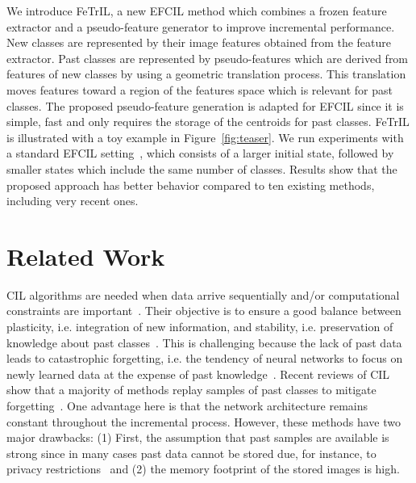 \documentclass[10pt,twocolumn,letterpaper]{article}
\makeatletter
\newcommand{\ourmodel}{FeTrIL\@\xspace}
\makeatother
\begin{document}
We introduce \ourmodel, a new EFCIL method which combines a frozen feature extractor and a pseudo-feature generator to improve incremental performance.
New classes are represented by their image features obtained from the feature extractor.
Past classes are represented by pseudo-features which are derived from features of new classes by using a geometric translation process.
This translation moves features toward a region of the features space which is relevant for past classes.
The proposed pseudo-feature generation is adapted for EFCIL since it is simple, fast and only requires the storage of the centroids for past classes.
\ourmodel is illustrated with a toy example in Figure~\ref{fig:teaser}.
We run experiments with a standard EFCIL setting~\cite{hou2019_lucir,zhu2021class,zhu2021pass}, which consists of a larger initial state, followed by smaller states which include the same number of classes.  
Results show that the proposed approach has better behavior compared to ten existing methods, including very recent ones.

\section{Related Work}
\label{sec:related}
CIL algorithms are needed when data arrive sequentially and/or computational constraints are important~\cite{hayes2022online,lange2019,masana2021_study,parisi2019_continual}. 
Their objective is to ensure a good balance between plasticity, i.e. integration of new information, and stability, i.e. preservation of knowledge about past classes~\cite{mermillod2013_stability_plasticity}.
This is challenging because the lack of past data leads to catastrophic forgetting, i.e. the tendency of neural networks to focus on newly learned data at the expense of past knowledge~\cite{mccloskey:catastrophic}.
Recent reviews of CIL~\cite{belouadah2021_study,masana2021_study} show that a majority of methods replay samples of past classes to mitigate  forgetting~\cite{castro2018_e2eil,hou2019_lucir,rebuffi2017_icarl,zhao2020_maintaining}.
One advantage here is that the network architecture remains constant throughout the incremental process. 
However, these methods have two major drawbacks: (1) 
First, the assumption that past samples are available is strong since in many cases past data cannot be stored due, for instance, to privacy restrictions~\cite{venkatesan2017strategy} and
(2) the memory footprint of the stored images is high. 
\end{document}
